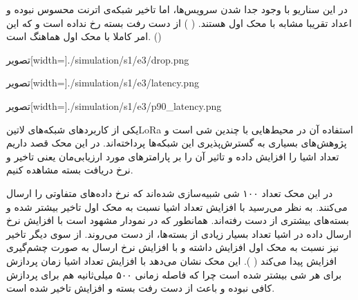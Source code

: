 در این سناریو با وجود جدا شدن سرویس‌ها، اما تاخیر شبکه‌ی اترنت محسوس نبوده و اعداد تقریبا مشابه با محک اول هستند.
( )
از دست رفت بسته رخ نداده است و که این امر کاملا با محک اول هماهنگ است. ()

‌تصویر[width=\textwidth]{./simulation/s1/e3/drop.png}

‌تصویر[width=\textwidth]{./simulation/s1/e3/latency.png}

‌تصویر[width=\textwidth]{./simulation/s1/e3/p90_latency.png}



یکی از کاربردهای شبکه‌های ‌لاتین{LoRa} استفاده آن در محیط‌هایی با چندین شی است و پژوهش‌های بسیاری به گسترش‌پذیری این شبکه‌ها پرداخته‌اند.
در این محک قصد داریم تعداد اشیا را افزایش داده و تاثیر آن را بر پارامترهای مورد ارزیابی‌مان یعنی تاخیر و نرخ دریافت بسته مشاهده کنیم.

در این محک تعداد ۱۰۰ شی شبیه‌سازی شده‌اند که نرخ داده‌های متفاوتی را ارسال می‌کنند. به نظر می‌رسید با افزایش تعداد اشیا نسبت به محک‌ اول تاخیر بیشتر شده و بسته‌های بیشتری
از دست رفته‌اند. همانطور که در نمودار  مشهود است با افزایش نرخ ارسال داده در اشیا
تعداد بسیار زیادی از بسته‌ها، از دست می‌روند.
از سوی دیگر تاخیر نیز نسبت به محک اول افزایش داشته و با افزایش نرخ ارسال به صورت چشم‌گیری افزایش پیدا می‌کند
( ).
این محک نشان می‌دهد با افزایش تعداد اشیا زمان پردازش برای هر شی بیشتر شده است چرا که فاصله زمانی ۵۰۰ میلی‌ثانیه هم برای پردازش کافی نبوده و باعث از دست رفت بسته و
افزایش تاخیر شده است.

